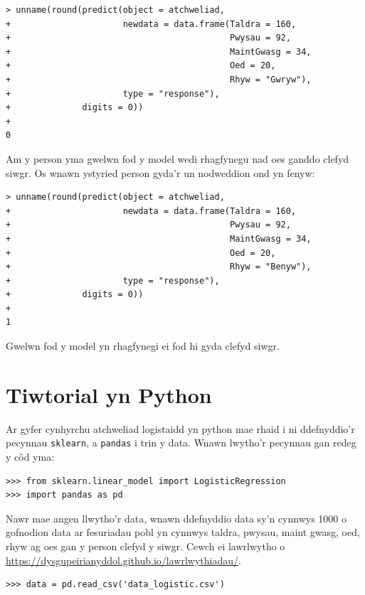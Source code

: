 \begin{verbatim}
> unname(round(predict(object = atchweliad, 
+                      newdata = data.frame(Taldra = 160,
+                                           Pwysau = 92, 
+                                           MaintGwasg = 34, 
+                                           Oed = 20, 
+                                           Rhyw = "Gwryw"), 
+                      type = "response"),
+              digits = 0))
+ 
0
\end{verbatim}

Am y person yma gwelwn fod y model wedi rhagfynegu nad oes ganddo clefyd siwgr. Os wnawn ystyried person gyda'r un nodweddion ond yn fenyw:

\begin{verbatim}
> unname(round(predict(object = atchweliad,
+                      newdata = data.frame(Taldra = 160,
+                                           Pwysau = 92, 
+                                           MaintGwasg = 34, 
+                                           Oed = 20, 
+                                           Rhyw = "Benyw"), 
+                      type = "response"),
+              digits = 0))
+ 
1
\end{verbatim}

Gwelwn fod y model yn rhagfynegi ei fod hi gyda clefyd siwgr.

\section{Tiwtorial yn Python}

Ar gyfer cynhyrchu atchweliad logistaidd yn python mae rhaid i ni ddefnyddio'r pecynnau \texttt{sklearn}, a \texttt{pandas} i trin y data. Wnawn lwytho'r pecynnau gan redeg y c\^{o}d yma:

\begin{verbatim}
>>> from sklearn.linear_model import LogisticRegression
>>> import pandas as pd
\end{verbatim}

Nawr mae angen llwytho'r data, wnawn ddefnyddio data sy'n cynnwys 1000 o gofnodion data ar fesuriadau pobl yn cynnwys taldra, pwysau, maint gwasg, oed, rhyw ag oes gan y person clefyd y siwgr. Cewch ei lawrlwytho o \url{https://dysgupeirianyddol.github.io/lawrlwythiadau/}.

\begin{verbatim}
>>> data = pd.read_csv('data_logistic.csv')
\end{verbatim}

